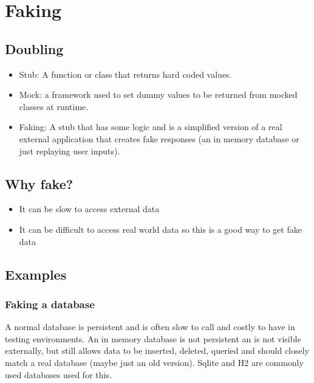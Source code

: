 \section{Faking}\label{sec:faking}

\subsection{Doubling}\label{sub:doubling}

\begin{itemize}
    \item Stub: A function or class that returns hard coded values.
    \item Mock: a framework used to set dummy values to be returned from mocked classes at runtime.
    \item Faking: A stub that has some logic and is a simplified version of a real external application that creates fake responses (an in memory database or just replaying user inputs).
\end{itemize}

\subsection{Why fake?}\label{sub:why_fake_}

\begin{itemize}
    \item It can be slow to access external data
    \item It can be difficult to access real world data so this is a good way to get fake data
\end{itemize}

\subsection{Examples}\label{sub:examples}

\subsubsection{Faking a database}\label{ssub:faking_a_database}

A normal database is persistent and is often slow to call and costly to have in testing environments.
An in memory database is not persistent an is not visible externally, but still allows data to be inserted, deleted, queried and should closely match a real database (maybe just an old version).
Sqlite and H2 are commonly used databases used for this.

